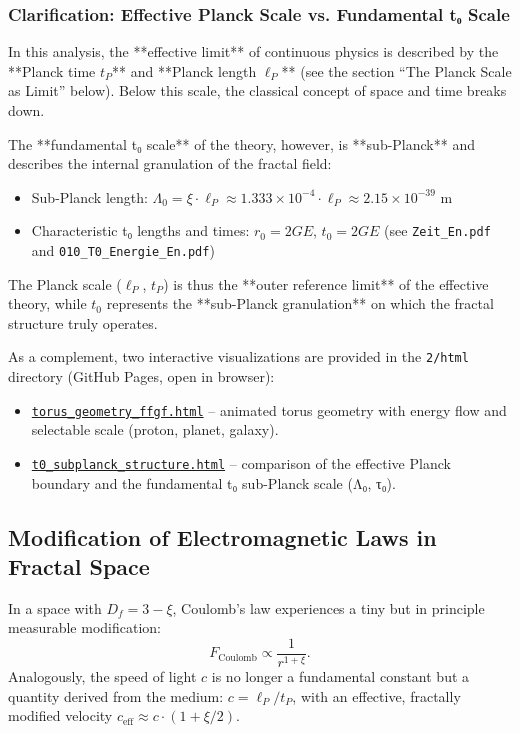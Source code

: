 \documentclass[12pt,a4paper]{article}
\begin{document}
	\subsubsection{Clarification: Effective Planck Scale vs. Fundamental t₀ Scale}
	In this analysis, the **effective limit** of continuous physics is described by the **Planck time \( t_P \)** and **Planck length \(\ell_P\)** (see the section ``The Planck Scale as Limit'' below). Below this scale, the classical concept of space and time breaks down.
	
	The **fundamental t₀ scale** of the theory, however, is **sub-Planck** and describes the internal granulation of the fractal field:
	\begin{itemize}
		\item Sub-Planck length: \(\Lambda_0 = \xi \cdot \ell_P \approx 1.333 \times 10^{-4} \cdot \ell_P \approx 2.15 \times 10^{-39} \) m
		\item Characteristic t₀ lengths and times: \( r_0 = 2GE \), \( t_0 = 2GE \) (see \texttt{Zeit\_En.pdf} and \texttt{010\_T0\_Energie\_En.pdf})
	\end{itemize}
	
	The Planck scale (\(\ell_P\), \( t_P \)) is thus the **outer reference limit** of the effective theory, while \( t_0 \) represents the **sub-Planck granulation** on which the fractal structure truly operates.
	
	As a complement, two interactive visualizations are provided in the \texttt{2/html} directory (GitHub Pages, open in browser):
	\begin{itemize}
		\item \href{https://jpascher.github.io/T0-Time-Mass-Duality/2/html/torus_geometry_ffgf.html}{\texttt{torus\_geometry\_ffgf.html}} – animated torus geometry with energy flow and selectable scale (proton, planet, galaxy).
		\item \href{https://jpascher.github.io/T0-Time-Mass-Duality/2/html/t0_subplanck_structure.html}{\texttt{t0\_subplanck\_structure.html}} – comparison of the effective Planck boundary and the fundamental t₀ sub-Planck scale (Λ₀, τ₀).
	\end{itemize}
	
	\subsection{Modification of Electromagnetic Laws in Fractal Space}
	In a space with \(D_f = 3-\xi\), Coulomb's law experiences a tiny but in principle measurable modification:
	\begin{equation}
		F_{\text{Coulomb}} \propto \frac{1}{r^{1 + \xi}}.
		\label{eq:fractal_coulomb}
	\end{equation}
	Analogously, the speed of light \(c\) is no longer a fundamental constant but a quantity derived from the medium: \(c = \ell_P / t_P\), with an effective, fractally modified velocity \(c_{\text{eff}} \approx c \cdot (1 + \xi/2)\).
	
\end{document}
